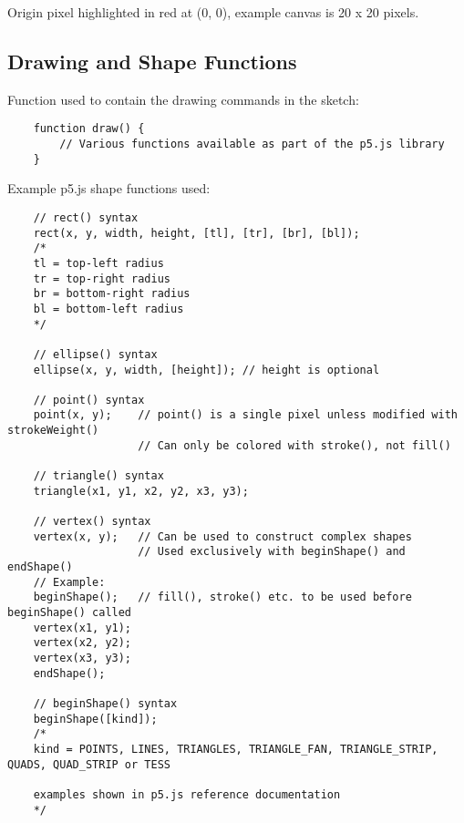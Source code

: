 \documentclass{article}
\begin{document}
\begin{center}

\vspace*{0.5cm}
Origin pixel highlighted in red at (0, 0), example canvas is 20 x 20 pixels.
\end{center}

\newpage
\subsection*{Drawing and Shape Functions}
\noindent Function used to contain the drawing commands in the sketch:
\begin{verbatim}
    function draw() {
        // Various functions available as part of the p5.js library
    }
    \end{verbatim}

\noindent Example p5.js shape functions used:

\begin{verbatim}
    // rect() syntax
    rect(x, y, width, height, [tl], [tr], [br], [bl]);
    /*
    tl = top-left radius
    tr = top-right radius
    br = bottom-right radius
    bl = bottom-left radius
    */

    // ellipse() syntax
    ellipse(x, y, width, [height]); // height is optional
    
    // point() syntax
    point(x, y);    // point() is a single pixel unless modified with strokeWeight()
                    // Can only be colored with stroke(), not fill()
    
    // triangle() syntax
    triangle(x1, y1, x2, y2, x3, y3);

    // vertex() syntax
    vertex(x, y);   // Can be used to construct complex shapes
                    // Used exclusively with beginShape() and endShape()
    // Example:
    beginShape();   // fill(), stroke() etc. to be used before beginShape() called
    vertex(x1, y1);  
    vertex(x2, y2);
    vertex(x3, y3);
    endShape();

    // beginShape() syntax
    beginShape([kind]);
    /*
    kind = POINTS, LINES, TRIANGLES, TRIANGLE_FAN, TRIANGLE_STRIP, QUADS, QUAD_STRIP or TESS

    examples shown in p5.js reference documentation
    */

    \end{verbatim}
\end{document}
